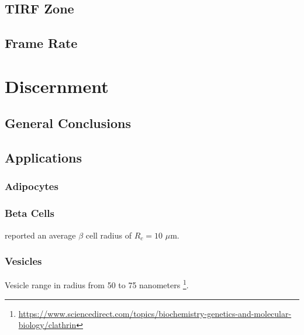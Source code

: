 \documentclass{report}
\begin{document}
\section{TIRF Zone}
\section{Frame Rate}

\chapter{Discernment}
\section{General Conclusions}
\section{Applications}

\subsection{Adipocytes}
\cite{soula2013modelling}

\subsection{Beta Cells}
\cite{marchetti2017pancreatic} reported an average $\beta$ cell radius of $R_c = 10$ $\mu$m.

\subsection{Vesicles}
Vesicle range in radius from 50 to 75 nanometers \cite{ales2007gene}\footnote{\url{https://www.sciencedirect.com/topics/biochemistry-genetics-and-molecular-biology/clathrin}}.



\end{document}
